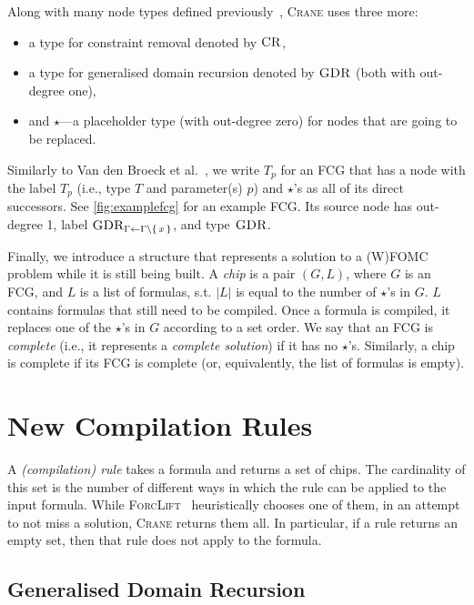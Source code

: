 \documentclass{article}
\theoremstyle{definition}
\DeclareMathOperator{\CR}{\textsc{CR}}
\DeclareMathOperator{\GDR}{\textsc{GDR}}
\begin{document}
Along with many node types defined
previously~\cite{DBLP:conf/nips/Broeck11,DBLP:conf/ijcai/BroeckTMDR11},
\textsc{Crane} uses three more:
\begin{itemize}
  \item a type for constraint removal denoted by $\CR$,
  \item a type for generalised domain recursion denoted by $\GDR$ (both with
        out-degree one),
  \item and $\star$---a placeholder type (with out-degree zero) for nodes that
        are going to be replaced.
\end{itemize}
Similarly to Van den Broeck et al.~, we
write $T_p$ for an FCG that has a node with the label $T_p$ (i.e., type $T$ and
parameter(s) $p$) and $\star$'s as all of its direct successors. See
\cref{fig:examplefcg} for an example FCG\@. Its source node has out-degree 1,
label $\GDR_{\Gamma \gets \Gamma \setminus \{\, x \,\}}$, and type $\GDR$.

Finally, we introduce a structure that represents a solution to a (W)FOMC
problem while it is still being built. A \emph{chip} is a pair $(G, L)$, where
$G$ is an FCG, and $L$ is a list of formulas, s.t. $|L|$ is equal to the number
of $\star$'s in $G$. $L$ contains formulas that still need to be compiled. Once
a formula is compiled, it replaces one of the $\star$'s in $G$ according to a
set order. We say that an FCG is \emph{complete} (i.e., it represents a
\emph{complete solution}) if it has no $\star$'s. Similarly, a chip is complete
if its FCG is complete (or, equivalently, the list of formulas is empty).

\section{New Compilation Rules}\label{sec:rules}

A \emph{(compilation) rule} takes a formula and returns a set of chips. The
cardinality of this set is the number of different ways in which the rule can be
applied to the input formula. While
\textsc{ForcLift}~\cite{DBLP:conf/ijcai/BroeckTMDR11} heuristically chooses one
of them, in an attempt to not miss a solution, \textsc{Crane} returns them all.
In particular, if a rule returns an empty set, then that rule does not apply to
the formula.

\subsection{Generalised Domain Recursion}\label{sec:dr}
\end{document}
